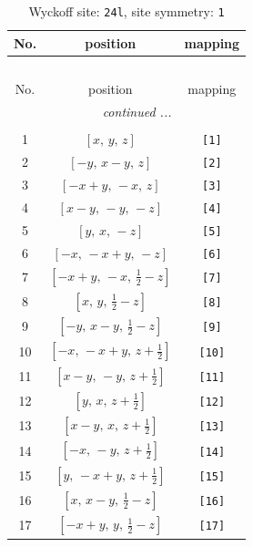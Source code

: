 \documentclass[fleqn,8pt]{jsarticle}
\begin{document}
\begin{longtable}{ccc}
\caption{Wyckoff site: {\tt 24l}, site symmetry: {\tt 1}}
 \\
 \hline \hline
No. & position & mapping \\ \hline \endfirsthead

\multicolumn{2}{l}{\tablename\ \thetable{}} \\
 \hline \hline
No. & position & mapping \\ \hline \endhead

 \hline \hline
\multicolumn{2}{r}{\footnotesize\it continued ...} \\ \endfoot

 \hline \hline
\multicolumn{2}{r}{} \\ \endlastfoot

1 & $\left[ x,\, y,\, z \right]$ & {\tt [1]} \\ \hline
2 & $\left[ - y,\, x - y,\, z \right]$ & {\tt [2]} \\ \hline
3 & $\left[ - x + y,\, - x,\, z \right]$ & {\tt [3]} \\ \hline
4 & $\left[ x - y,\, - y,\, - z \right]$ & {\tt [4]} \\ \hline
5 & $\left[ y,\, x,\, - z \right]$ & {\tt [5]} \\ \hline
6 & $\left[ - x,\, - x + y,\, - z \right]$ & {\tt [6]} \\ \hline
7 & $\left[ - x + y,\, - x,\, \frac{1}{2} - z \right]$ & {\tt [7]} \\ \hline
8 & $\left[ x,\, y,\, \frac{1}{2} - z \right]$ & {\tt [8]} \\ \hline
9 & $\left[ - y,\, x - y,\, \frac{1}{2} - z \right]$ & {\tt [9]} \\ \hline
10 & $\left[ - x,\, - x + y,\, z + \frac{1}{2} \right]$ & {\tt [10]} \\ \hline
11 & $\left[ x - y,\, - y,\, z + \frac{1}{2} \right]$ & {\tt [11]} \\ \hline
12 & $\left[ y,\, x,\, z + \frac{1}{2} \right]$ & {\tt [12]} \\ \hline
13 & $\left[ x - y,\, x,\, z + \frac{1}{2} \right]$ & {\tt [13]} \\ \hline
14 & $\left[ - x,\, - y,\, z + \frac{1}{2} \right]$ & {\tt [14]} \\ \hline
15 & $\left[ y,\, - x + y,\, z + \frac{1}{2} \right]$ & {\tt [15]} \\ \hline
16 & $\left[ x,\, x - y,\, \frac{1}{2} - z \right]$ & {\tt [16]} \\ \hline
17 & $\left[ - x + y,\, y,\, \frac{1}{2} - z \right]$ & {\tt [17]} \\ \hline

\end{longtable}
\end{document}
